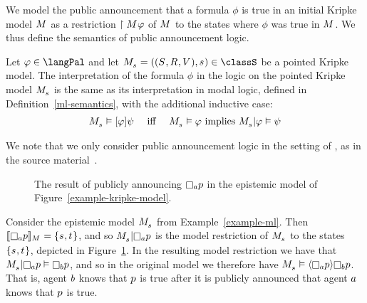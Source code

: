 We model the public announcement that a formula $\phi$ is true in an initial Kripke model $\kModel$ as a restriction $\restriction{\kModel}{\phi}$ of $\kModel$ to the states where $\phi$ was true in $\kModel$.
We thus define the semantics of public announcement logic.

\begin{definition}\label{pal-semantics}
Let $\phi \in \langPal$ and let $\kPModelAndTuple{\kStateS} \in \classS$ be a pointed Kripke model.
The interpretation of the formula $\phi$ in the logic \logicPalS{} on the pointed Kripke model $\kPModel{\kStateS}$ is the same as its interpretation in modal logic, defined in Definition~\ref{ml-semantics}, with the additional inductive case:
$$
\begin{array}{lcl}
\kPModel{\kStateS} \entails \announceA{\phi} \psi & \text{ iff } & \kPModel{\kStateS} \entails \phi \text{ implies } \restrict{\kPModel{\kStateS}}{\phi} \entails \psi
\end{array}
$$
\end{definition}

We note that we only consider public announcement logic in the setting of \classS{}, as in the source material~\cite{plaza:1989}.

\begin{example}\label{example-pal}
\begin{figure}
    \caption{The result of publicly announcing $\knowsA \atomP$ in the epistemic model of Figure~\ref{example-kripke-model}.}\label{example-public-announcement}
    \centering
\end{figure}
Consider the epistemic model $\kPModel{\kStateS}$ from Example~\ref{example-ml}.
Then $\interpretation[\kModel]{\knowsA \atomP} = \{\kStateS, \kStateT\}$, and so $\restrict{\kPModel{\kStateS}}{\knowsA \atomP}$ is the model restriction of $\kPModel{\kStateS}$ to the states $\{\kStateS, \kStateT\}$, depicted in Figure~\ref{example-public-announcement}.  
In the resulting model restriction we have that $\restrict{\kPModel{\kStateS}}{\knowsA \atomP} \entails \knowsB \atomP$, and so in the original model we therefore have $\kPModel{\kStateS} \entails \announceE{\knowsA \atomP} \knowsB \atomP$.
That is, agent $b$ knows that $p$ is true after it is publicly announced that agent $a$ knows that $p$ is true.
\end{example}

